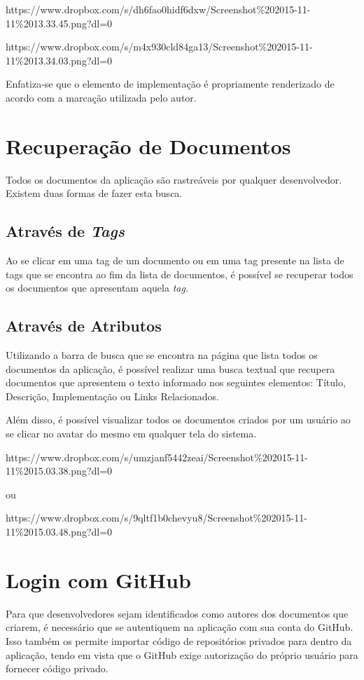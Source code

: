 https://www.dropbox.com/s/dh6fao0hidf6dxw/Screenshot\%202015-11-11\%2013.33.45.png?dl=0

https://www.dropbox.com/s/m4x930cld84ga13/Screenshot\%202015-11-11\%2013.34.03.png?dl=0

Enfatiza-se que o elemento de implementação é propriamente renderizado de acordo com a marcação utilizada pelo autor.

\section{Recuperação de Documentos}

Todos os documentos da aplicação são rastreáveis por qualquer desenvolvedor. Existem duas formas de fazer esta busca.

\subsection{Através de \textit{Tags}}

Ao se clicar em uma tag de um documento ou em uma tag presente na lista de tags que se encontra ao fim da lista de documentos, é possível se recuperar todos os documentos que apresentam aquela \textit{tag}.

\subsection{Através de Atributos}

Utilizando a barra de busca que se encontra na página que lista todos os documentos da aplicação, é possível realizar uma busca textual que recupera documentos que apresentem o texto informado nos seguintes elementos: Título, Descrição, Implementação ou Links Relacionados.

Além disso, é possível visualizar todos os documentos criados por um usuário ao se clicar no avatar do mesmo em qualquer tela do sistema.

https://www.dropbox.com/s/umzjanf5442zeai/Screenshot\%202015-11-11\%2015.03.38.png?dl=0

ou

https://www.dropbox.com/s/9qltf1b0chevyu8/Screenshot\%202015-11-11\%2015.03.48.png?dl=0

\section{Login com GitHub}

Para que desenvolvedores sejam identificados como autores dos documentos que criarem, é necessário que se autentiquem na aplicação com sua conta do GitHub. Isso também os permite importar código de repositórios privados para dentro da aplicação, tendo em vista que o GitHub exige autorização do próprio usuário para fornecer código privado.

